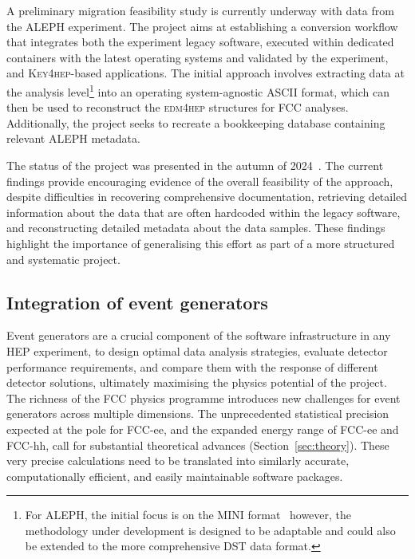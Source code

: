 A preliminary migration feasibility study is currently underway with data from the ALEPH experiment. 
The project aims at establishing a conversion workflow that integrates both the experiment legacy software, 
executed within dedicated containers with the latest operating systems and validated by the experiment, 
and \textsc{Key4hep}-based applications. 
The initial approach involves extracting data at the analysis 
level\footnote{For ALEPH, the initial focus is on the MINI format~\cite{alephnumbers} 
however, the methodology under development is designed to be adaptable 
and could also be extended to the more comprehensive DST data format.} 
into an operating system-agnostic ASCII format, 
which can then be used to reconstruct the \textsc{edm4hep} structures for FCC analyses. 
Additionally, the project seeks to recreate a bookkeeping database containing relevant ALEPH metadata.

The status of the project was presented in the autumn of 2024~\cite{alephe4hdphep,alephe4hfccfrit}.
The current findings provide encouraging evidence of the overall feasibility of the approach,
despite difficulties in recovering comprehensive documentation, 
retrieving detailed information about the data that are often hardcoded within the legacy software,
and reconstructing detailed metadata about the data samples. 
These findings highlight the importance of generalising this effort as part of a more structured and systematic project.
 
\subsection{Integration of event generators}
\label{sec:generators}

Event generators are a crucial component of the software infrastructure in any HEP experiment, 
to design optimal data analysis strategies, evaluate detector performance requirements, 
and compare them with the response of different detector solutions, 
ultimately maximising the physics potential of the project. 
The richness of the FCC physics programme introduces new challenges for event generators across multiple dimensions. 
The unprecedented statistical precision expected at the \PZ pole for FCC-ee,
and the expanded energy range of FCC-ee and FCC-hh, 
call for substantial theoretical advances (Section~\ref{sec:theory}). 
These very precise calculations need to be translated into similarly accurate, computationally efficient, 
and easily maintainable software packages. 

